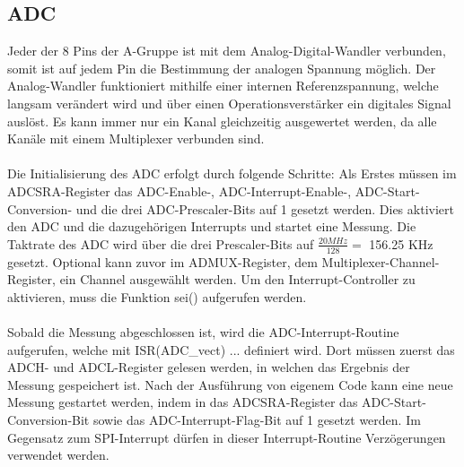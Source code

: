 \documentclass[12pt]{article}
\begin{document}
\newpage\subsection{ADC}
Jeder der 8 Pins der A-Gruppe ist mit dem Analog-Digital-Wandler verbunden, somit ist auf jedem Pin die Bestimmung der analogen Spannung möglich. Der Analog-Wandler funktioniert mithilfe einer internen Referenzspannung, welche langsam verändert wird und über einen Operationsverstärker ein digitales Signal auslöst. Es kann immer nur ein Kanal gleichzeitig ausgewertet werden, da alle Kanäle mit einem Multiplexer verbunden sind. 
\\\\Die Initialisierung des ADC erfolgt durch folgende Schritte: Als Erstes müssen im ADCSRA-Register das ADC-Enable-, ADC-Interrupt-Enable-, ADC-Start-Conversion- und die drei ADC-Prescaler-Bits auf 1 gesetzt werden. Dies aktiviert den ADC und die dazugehörigen Interrupts und startet eine Messung. Die Taktrate des ADC wird über die drei Prescaler-Bits auf  $\frac{20MHz}{128} = $ 156.25 KHz gesetzt. Optional kann zuvor im ADMUX-Register, dem Multiplexer-Channel-Register, ein Channel ausgewählt werden. Um den Interrupt-Controller zu aktivieren, muss die Funktion sei() aufgerufen werden.
\\\\Sobald die Messung abgeschlossen ist, wird die ADC-Interrupt-Routine aufgerufen, welche mit ISR(ADC\_vect) { ... } definiert wird. Dort müssen zuerst das ADCH- und ADCL-Register gelesen werden, in welchen das Ergebnis der Messung gespeichert ist. Nach der Ausführung von eigenem Code kann eine neue Messung gestartet werden, indem in das ADCSRA-Register das ADC-Start-Conversion-Bit sowie das ADC-Interrupt-Flag-Bit auf 1 gesetzt werden. Im Gegensatz zum SPI-Interrupt dürfen in dieser Interrupt-Routine Verzögerungen verwendet werden.
\end{document}
